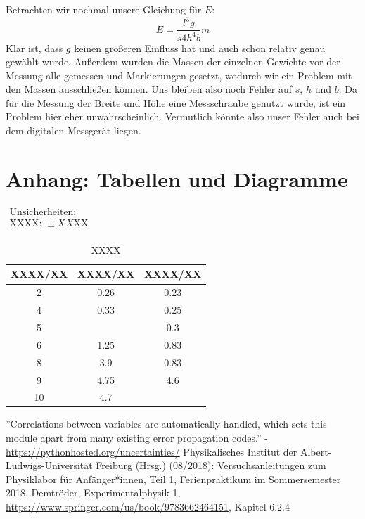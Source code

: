 \documentclass[11pt,a4paper]{article}
\begin{document}
Betrachten wir nochmal unsere Gleichung f\"ur $E$:
\[
E=\frac{l^3g}{s4h^4b}m
\]
Klar ist, dass $g$ keinen gr\"o\ss eren Einfluss hat und auch schon relativ genau gew\"ahlt wurde. Au\ss erdem wurden die Massen der einzelnen Gewichte vor der Messung alle gemessen und Markierungen gesetzt, wodurch wir ein Problem mit den Massen ausschlie\ss en k\"onnen. Uns bleiben also noch Fehler auf $s$, $h$ und $b$. Da f\"ur die Messung der Breite und H\"ohe eine Messschraube genutzt wurde, ist ein Problem hier eher unwahrscheinlich. Vermutlich k\"onnte also unser Fehler auch bei dem digitalen Messger\"at liegen.

\pagebreak

\section{Anhang: Tabellen und Diagramme}

\begin{table}[h]
\centering
\caption{XXXX} \vspace{11pt}
$\begin{array}{l}
\textrm{Unsicherheiten:}\\
\textrm{XXXX: } \pm XX \textrm{XX}\\
\end{array}$
\begin{tabular}{ccc}
\toprule
\textrm{XXXX}/\textrm{XX} & \textrm{XXXX}/\textrm{XX} & \textrm{XXXX}/\textrm{XX} \\
\midrule 
2 & 0.26 & 0.23\\
\hline
4 & 0.33 & 0.25\\
\hline 
5 & & 0.3\\
\hline 
6 & 1.25 & 0.83\\
\hline 
8 & 3.9 & 0.83\\ 
\hline
9 & 4.75 & 4.6\\ 
\hline
10 & 4.7 &\\ 
\bottomrule
\end{tabular}
\label{Tab:X}
\end{table}


\begin{thebibliography}{9}
''Correlations between variables are automatically handled, which sets this module apart from many existing error propagation codes.'' - \url{https://pythonhosted.org/uncertainties/}
 Physikalisches Institut der Albert-Ludwigs-Universität Freiburg (Hrsg.) (08/2018): Versuchsanleitungen zum Physiklabor für Anfänger*innen, Teil 1, Ferienpraktikum im Sommersemester 2018.
 Demtr\"oder, Experimentalphysik 1, \url{https://www.springer.com/us/book/9783662464151}, Kapitel 6.2.4
\end{thebibliography}
\end{document}
